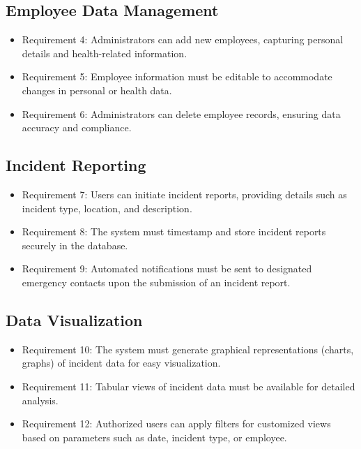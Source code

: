 \documentclass{scrreprt}
\begin{document}
\subsection{Employee Data Management}

\begin{itemize}
    \item Requirement 4: Administrators can add new employees, capturing personal details and health-related information.
    \item Requirement 5: Employee information must be editable to accommodate changes in personal or health data.
    \item Requirement 6: Administrators can delete employee records, ensuring data accuracy and compliance.
\end{itemize}

\subsection{Incident Reporting}

\begin{itemize}
    \item Requirement 7: Users can initiate incident reports, providing details such as incident type, location, and description.
    \item Requirement 8: The system must timestamp and store incident reports securely in the database.
    \item Requirement 9: Automated notifications must be sent to designated emergency contacts upon the submission of an incident report.
\end{itemize}

\subsection{Data Visualization}

\begin{itemize}
    \item Requirement 10: The system must generate graphical representations (charts, graphs) of incident data for easy visualization.
    \item Requirement 11: Tabular views of incident data must be available for detailed analysis.
    \item Requirement 12: Authorized users can apply filters for customized views based on parameters such as date, incident type, or employee.
\end{itemize}
\end{document}
